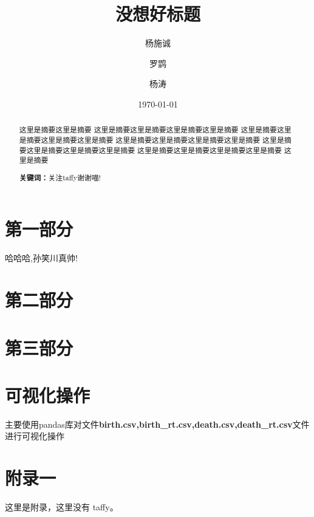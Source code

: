 \documentclass{ctexart}
\title{没想好标题}
\author{杨施诚 \and 罗鹍 \and 杨涛}
\date{\today}
\begin{document}
    \maketitle
    \begin{abstract}
        {\noindent 这里是摘要这里是摘要
        这里是摘要这里是摘要这里是摘要这里是摘要
        这里是摘要这里是摘要这里是摘要这里是摘要
        这里是摘要这里是摘要这里是摘要这里是摘要
        这里是摘要这里是摘要这里是摘要这里是摘要
        这里是摘要这里是摘要这里是摘要这里是摘要
        这里是摘要}
        \par\noindent \textbf{关键词：}关注taffy谢谢喵!
    \end{abstract}

    \newpage
    \tableofcontents

    \newpage
    \section{第一部分}
    哈哈哈,孙笑川真帅!
    
    \section{第二部分}
    
    \section{第三部分}
    
    \section{可视化操作}
    \noindent 主要使用pandas库对文件\textbf{birth.csv,birth\_rt.csv,death.csv,death\_rt.csv}文件进行可视化操作

    \newpage
    \appendix
    \section{附录一}
    这里是附录，这里没有 taffy。


    
\end{document}

